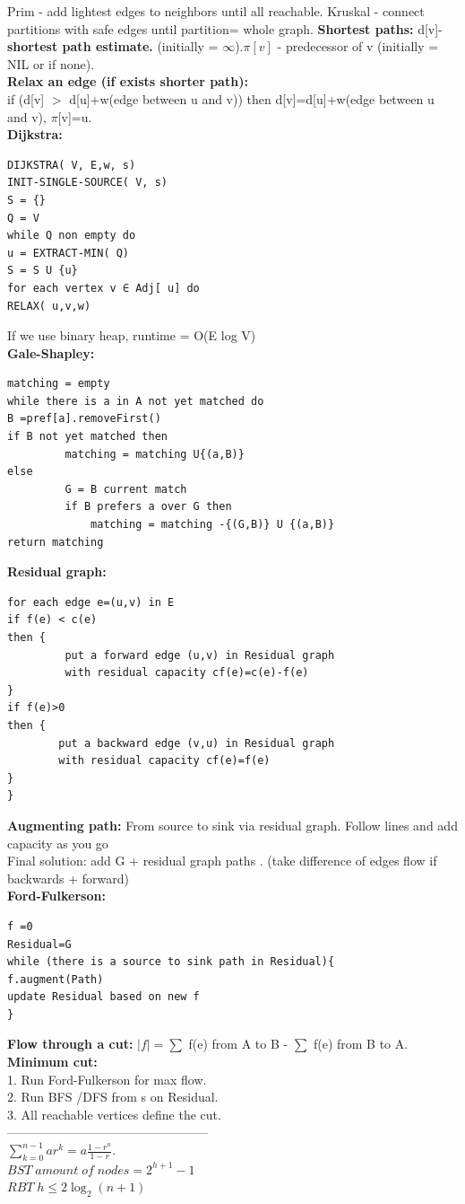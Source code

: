 \documentclass[paper=a4, fontsize=10pt]{scrartcl} %
\begin{document}
Prim - add lightest edges to neighbors until all reachable. Kruskal - connect partitions with safe edges until partition= whole graph.
\textbf{Shortest paths:} d[v]- \textbf{shortest path estimate.} (initially = $\infty$).$\pi[v]$ - predecessor of v (initially = NIL or if none).\\
\textbf{Relax an edge (if exists shorter path):}\\
if (d[v] $>$ d[u]+w(edge between u and v)) then d[v]=d[u]+w(edge between u and v), $\pi$[v]=u.\\
\textbf{Dijkstra: }\\
\begin{lstlisting}[frame=single]
DIJKSTRA( V, E,w, s)
INIT-SINGLE-SOURCE( V, s)
S = {}
Q = V
while Q non empty do
u = EXTRACT-MIN( Q)
S = S U {u}
for each vertex v ∈ Adj[ u] do
RELAX( u,v,w)
\end{lstlisting}
If we use binary heap, runtime = O(E log V)\\
\textbf{Gale-Shapley:} \\
\begin{lstlisting}[frame=single]
matching = empty
while there is a in A not yet matched do	
B =pref[a].removeFirst()	
if B not yet matched then
	 	 matching = matching U{(a,B)}	
else	
	 	 G = B current match 	
	 	 if B prefers a over G then
	 	 	 matching = matching -{(G,B)} U {(a,B)}
return matching
\end{lstlisting}
\textbf{Residual graph:}
\begin{lstlisting}[frame=single]
for each edge e=(u,v) in E
if f(e) < c(e)	
then {	
	 	 put a forward edge (u,v) in Residual graph
	 	 with residual capacity cf(e)=c(e)-f(e)	
}	
if f(e)>0	
then {	
	 	put a backward edge (v,u) in Residual graph
	 	with residual capacity cf(e)=f(e)	
}	
}	
\end{lstlisting}
\textbf{Augmenting path: }From source to sink via residual graph. Follow lines and add capacity as you go\\
Final solution: add G + residual graph paths . (take difference of edges flow if backwards + forward)\\
\textbf{Ford-Fulkerson:}\\
\begin{lstlisting}[frame=single]
f =0
Residual=G
while (there is a source to sink path in Residual){
f.augment(Path)
update Residual based on new f
}
\end{lstlisting}
\textbf{Flow through a cut: } $|f|=\sum$ f(e) from A to B - $\sum$ f(e) from B to A.\\
\textbf{Minimum cut: } \\
1. Run Ford-Fulkerson for max flow.\\
2. Run BFS /DFS from s on Residual.\\
3. All reachable vertices define the cut.\\
------------------------------------------------\\
$\sum_{k=0}^{n-1}ar^k=a\frac{1-r^n}{1-r}$.\\
$BST \; amount \; of \; nodes=2^{h+1}-1$\\
$RBT \; h \leq 2 \log_2(n+1)$\\
\end{document}
